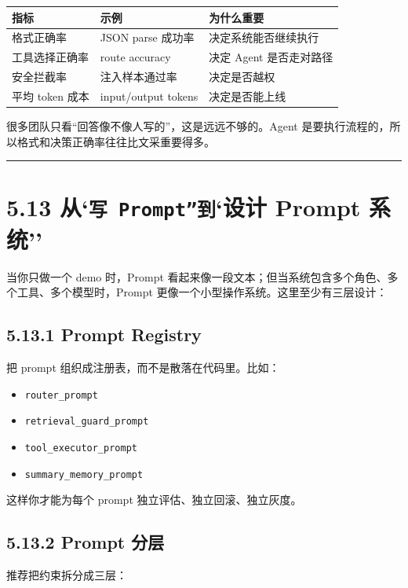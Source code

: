 \begingroup
\scriptsize
\setlength{\tabcolsep}{3pt}
\begin{longtable}{|p{}|p{}|p{}|}
\hline
指标 & 示例 & 为什么重要 \\ \hline
格式正确率 & JSON parse 成功率 & 决定系统能否继续执行 \\ \hline
工具选择正确率 & route accuracy & 决定 Agent 是否走对路径 \\ \hline
安全拦截率 & 注入样本通过率 & 决定是否越权 \\ \hline
平均 token 成本 & input/output tokens & 决定是否能上线 \\ \hline
\end{longtable}
\endgroup

很多团队只看``回答像不像人写的''，这是远远不够的。Agent 是要执行流程的，所以格式和决策正确率往往比文采重要得多。


\bigskip\hrule\bigskip

\section{5.13 从`\texttt{写 Prompt''到}`设计 Prompt 系统''}

当你只做一个 demo 时，Prompt 看起来像一段文本；但当系统包含多个角色、多个工具、多个模型时，Prompt 更像一个小型操作系统。这里至少有三层设计：


\subsection{5.13.1 Prompt Registry}

把 prompt 组织成注册表，而不是散落在代码里。比如：


\begin{itemize}[leftmargin=2em]
\item \texttt{router\_prompt}
\item \texttt{retrieval\_guard\_prompt}
\item \texttt{tool\_executor\_prompt}
\item \texttt{summary\_memory\_prompt}
\end{itemize}

这样你才能为每个 prompt 独立评估、独立回滚、独立灰度。


\subsection{5.13.2 Prompt 分层}

推荐把约束拆分成三层：


